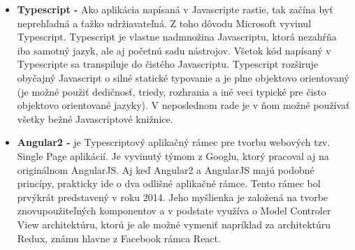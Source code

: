 \begin{itemize}
    \item \textbf{Typescript -} Ako aplikácia napísaná v Javascripte rastie, tak začína byť neprehľadná a ťažko udržiavateľná. Z toho dôvodu Microsoft vyvinul Typescript. Typescript je vlastne nadmnožina Javascriptu, ktorá nezahŕňa iba samotný jazyk, ale aj početnú sadu nástrojov. Všetok kód napísaný v Typescripte sa transpiluje do čistého Javascriptu. Typescript rozširuje obyčajný Javascript o silné statické typovanie a je plne objektovo orientovaný (je možné použiť dedičnosť, triedy, rozhrania a iné veci typické pre čisto objektovo orientované jazyky). V neposlednom rade je v ňom možné používať všetky bežné Javascriptové knižnice. \cite{f7jKojjQlPsziQuS}
    \item \textbf{Angular2 -} je Typescriptový aplikačný rámec pre tvorbu webových tzv. Single Page aplikácií. Je vyvinutý týmom z Googlu, ktorý pracoval aj na originálnom AngularJS. Aj keď Angular2 a AngularJS majú podobné princípy, prakticky ide o dva odlišné aplikačné rámce. Tento rámec bol prvýkrát predstavený v roku 2014. Jeho myšlienka je založená na tvorbe znovupoužiteľných komponentov a v podstate využíva o Model Controler View architektúru, ktorú je ale možné vymeniť napríklad za architektúru Redux, známu hlavne z Facebook rámca React. \cite{oHlcq3e3366Aa2oa}
    

\end{itemize}
